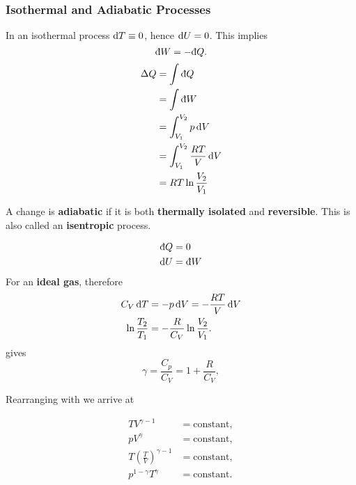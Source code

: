 \subsubsection{Isothermal and Adiabatic Processes}
\begin{thrm}
In an isothermal process $\dif T\equiv0$, hence $\dif U=0$. 
This implies
\begin{equation}
\indiff W=-\indiff Q.
\end{equation}
\begin{equation}
\begin{aligned}
\Delta Q&=\int \indiff Q \\
&=\int \indiff W \\
&=\int_{V_1}^{V_2}p\dif V \\
&=\int_{V_1}^{V_2}\frac{RT}{V}\dif V \\
&=RT\ln\frac{V_2}{V_1}
\end{aligned}
\end{equation}
\end{thrm}

\begin{defi}
A change is \textbf{adiabatic} if it is both \textbf{thermally isolated} and \textbf{reversible}. 
This is also called an \textbf{isentropic} process. 
\end{defi}
\begin{lemma}
\begin{subequations}
\begin{align}
\indiff Q&=0 \\
\dif U&=\indiff W
\end{align}
\end{subequations}
For an \textbf{ideal gas}, therefore 
\begin{subequations}
\begin{align}
C_V\dif T&=-p\dif V=-\frac{RT}{V}\dif V \\
\ln\frac{T_2}{T_1}&=-\frac{R}{C_V}\ln\frac{V_2}{V_1}. \label{eq:adia}
\end{align}
\end{subequations}
 gives
\begin{equation}
\gamma=\frac{C_p}{C_V}=1+\frac{R}{C_V},
\end{equation}
\end{lemma}
Rearranging with  we arrive at 
\begin{thrm}
\begin{equation}
\begin{aligned}
TV^{\gamma-1}&=\text{constant}, \\
pV^{\gamma}&=\text{constant}, \\
T\left(\frac{T}{V}\right)^{\gamma-1}&=\text{constant}, \\
p^{1-\gamma}T^{\gamma}&=\text{constant}.
\end{aligned}
\end{equation}
\end{thrm}

